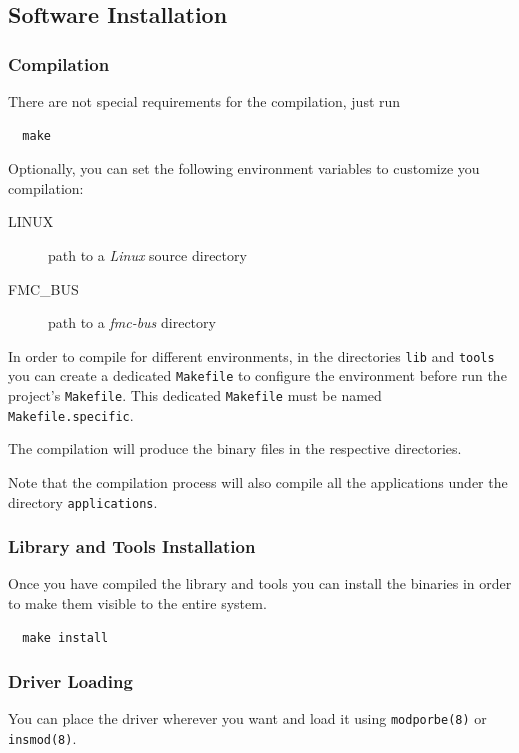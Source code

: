 \documentclass[a4paper,10pt]{article}
\begin{document}
\subsection{Software Installation}%
\subsubsection{Compilation}
There are not special requirements for the compilation, just run

\begin{verbatim}
  make
\end{verbatim}

Optionally, you can set the following environment variables to
customize you compilation:
\begin{description}
  \item[LINUX] path to a \textit{Linux} source directory
  \item[FMC\_BUS] path to a \textit{fmc-bus} directory
\end{description}

In order to compile for different environments, in the directories
\texttt{lib} and \texttt{tools} you can create a dedicated
\texttt{Makefile} to configure the environment before run the
project's \texttt{Makefile}. This dedicated \texttt{Makefile} must be
named \texttt{Makefile.specific}.

The compilation will produce the binary files in the respective
directories.

Note that the compilation process will also compile all the
applications under the directory \texttt{applications}.

\subsubsection{Library and Tools Installation}
Once you have compiled the library and tools you can install the
binaries in order to make them visible to the entire system.

\begin{verbatim}
  make install
\end{verbatim}

\subsubsection{Driver Loading}
You can place the driver wherever you want and load it using
\texttt{modporbe(8)} or \texttt{insmod(8)}.
\end{document}
